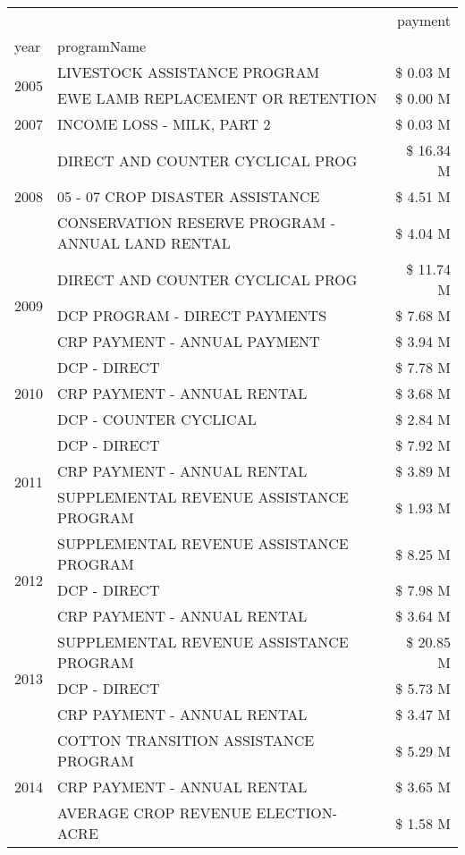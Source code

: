\begin{tabular}{llr}
\toprule
 &  & payment \\
year & programName &  \\
\midrule
\multirow[t]{2}{*}{2005} & LIVESTOCK ASSISTANCE PROGRAM & \$ 0.03 M \\
 & EWE LAMB REPLACEMENT OR RETENTION & \$ 0.00 M \\
\cline{1-3}
2007 & INCOME LOSS - MILK, PART 2 & \$ 0.03 M \\
\cline{1-3}
\multirow[t]{3}{*}{2008} & DIRECT AND COUNTER CYCLICAL PROG & \$ 16.34 M \\
 & 05 - 07 CROP DISASTER ASSISTANCE & \$ 4.51 M \\
 & CONSERVATION RESERVE PROGRAM - ANNUAL LAND RENTAL & \$ 4.04 M \\
\cline{1-3}
\multirow[t]{3}{*}{2009} & DIRECT AND COUNTER CYCLICAL PROG & \$ 11.74 M \\
 & DCP PROGRAM - DIRECT PAYMENTS & \$ 7.68 M \\
 & CRP PAYMENT - ANNUAL PAYMENT & \$ 3.94 M \\
\cline{1-3}
\multirow[t]{3}{*}{2010} & DCP - DIRECT & \$ 7.78 M \\
 & CRP PAYMENT - ANNUAL RENTAL & \$ 3.68 M \\
 & DCP - COUNTER CYCLICAL & \$ 2.84 M \\
\cline{1-3}
\multirow[t]{3}{*}{2011} & DCP - DIRECT & \$ 7.92 M \\
 & CRP PAYMENT - ANNUAL RENTAL & \$ 3.89 M \\
 & SUPPLEMENTAL REVENUE ASSISTANCE PROGRAM & \$ 1.93 M \\
\cline{1-3}
\multirow[t]{3}{*}{2012} & SUPPLEMENTAL REVENUE ASSISTANCE PROGRAM & \$ 8.25 M \\
 & DCP - DIRECT & \$ 7.98 M \\
 & CRP PAYMENT - ANNUAL RENTAL & \$ 3.64 M \\
\cline{1-3}
\multirow[t]{3}{*}{2013} & SUPPLEMENTAL REVENUE ASSISTANCE PROGRAM & \$ 20.85 M \\
 & DCP - DIRECT & \$ 5.73 M \\
 & CRP PAYMENT - ANNUAL RENTAL & \$ 3.47 M \\
\cline{1-3}
\multirow[t]{3}{*}{2014} & COTTON TRANSITION ASSISTANCE PROGRAM & \$ 5.29 M \\
 & CRP PAYMENT - ANNUAL RENTAL & \$ 3.65 M \\
 & AVERAGE CROP REVENUE ELECTION-ACRE & \$ 1.58 M \\
\cline{1-3}

\end{tabular}
